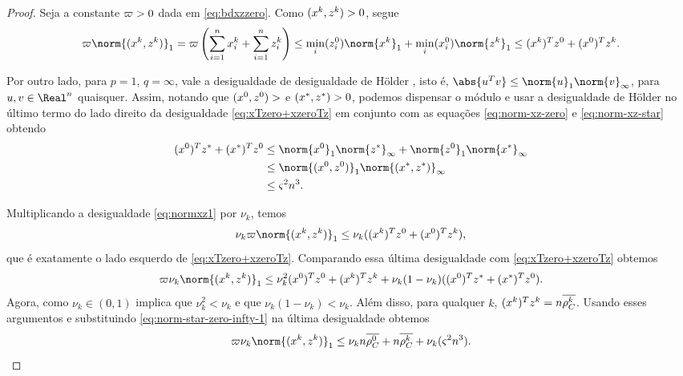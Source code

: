 \begin{proof}
Seja a constante $\varpi>0$ dada em \eqref{eq:bdxzzero}. Como  $(x^{k},z^{k})>0$, segue 
\begin{equation}
	\label{eq:normxz1}
	\bdxzzero\norm{(\xk,\zk)}_{1} = \bdxzzero\left(\sum_{i=1}^{n}\xk_{i} + \sum_{i=1}^{n}\zk_{i} \right) \leq \min_{i}(\zzero_{i})\norm{\xk}_{1} + \min_{i}(\xzero_{i})\norm{\zk}_{1}\leq
(\xk)^{T}\zzero + (\xzero)^{T}\zk.
\end{equation}

Por outro lado,  para  $p = 1 $, $q = \infty$, vale a desigualdade de desigualdade de Hölder \cite[p. 53]{Golub:1996wp}, isto é, $\abs{u^{T}v} \leq \norm{u}_{1}\norm{v}_{\infty}$, para $u,v\in\Real^{n}$ quaisquer. Assim, notando que $(x^0,z^0)>$ e $(x^*,z^*)>0$, podemos dispensar o módulo e usar a desigualdade de Hölder no último termo do lado direito da desigualdade \eqref{eq:xTzero+xzeroTz} em conjunto com as  equações \eqref{eq:norm-xz-zero} e \eqref{eq:norm-xz-star}  obtendo
	\begin{align}
	(\xzero)^{T}\zstar + (\xstar)^{T}\zzero  & \leq \norm{\xzero}_{1}\norm{\zstar}_{\infty} + \norm{\zzero}_{1}\norm{\xstar}_{\infty} \notag \\
	& \leq \norm{(\xzero,\zzero)}_1 \norm{(\xstar,\zstar)}_{\infty} \notag \\
	&  \leq \bdxzstar^{2} n^3. \label{eq:norm-star-zero-infty-1} 
	\end{align}



Multiplicando a desigualdade  \eqref{eq:normxz1} por $\nu_k$, temos 
\[
	\nu_k\bdxzzero\norm{(\xk,\zk)}_{1} \leq \nu_k((\xk)^{T}\zzero + (\xzero)^{T}\zk),
\]
que é exatamente o lado esquerdo de \eqref{eq:xTzero+xzeroTz}. Comparando essa última desigualdade com  \eqref{eq:xTzero+xzeroTz} obtemos 
\[
	\bdxzzero\nu_k\norm{(\xk,\zk)}_{1}  \leq \nu_k^{2}(\xzero)^T\zzero  + (\xk)^{T}\zk+  \nu_k(1-\nu_k)((\xzero)^{T}\zstar + (\xstar)^{T}\zzero). 
\]
Agora, como  $\nu_k\in(0,1)$ implica que $\nu_{k}^{2}< \nu_{k}$ e que $\nu_k(1-\nu_k) < \nu_k$. Além disso, para qualquer $k$, $(x^{k})^{T}z^{k} = n\overline{\rho_{C}^{k}}$.  Usando esses argumentos e substituindo \eqref{eq:norm-star-zero-infty-1} na última desigualdade obtemos
\[
	\bdxzzero\nu_k\norm{(\xk,\zk)}_{1} 	\leq \nu_k n\dbvec{\rho_C^0} + n\dbvec{\rho_C^{k}} + \nu_k(\bdxzstar^{2} n^3 ).  
\]


\end{proof}
